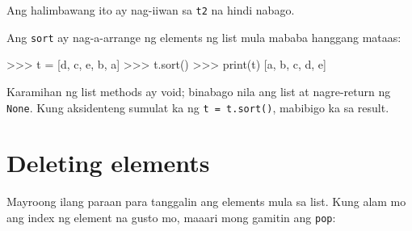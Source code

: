\documentclass[10pt,]{book}
\newenvironment{Shaded}{}{}
\newcommand{\BuiltInTok}[1]{\textcolor[rgb]{0.00,0.50,0.00}{#1}}
\newcommand{\NormalTok}[1]{#1}
\newcommand{\OperatorTok}[1]{\textcolor[rgb]{0.40,0.40,0.40}{#1}}
\newcommand{\StringTok}[1]{\textcolor[rgb]{0.25,0.44,0.63}{#1}}
\begin{document}
Ang halimbawang ito ay nag-iiwan sa \texttt{t2} na hindi nabago.

Ang \texttt{sort} ay nag-a-arrange ng elements ng list mula mababa
hanggang mataas:

 

\begin{Shaded}
\begin{Highlighting}[]
\OperatorTok{\textgreater{}\textgreater{}\textgreater{}}\NormalTok{ t }\OperatorTok{=}\NormalTok{ [}\StringTok{\textquotesingle{}d\textquotesingle{}}\NormalTok{, }\StringTok{\textquotesingle{}c\textquotesingle{}}\NormalTok{, }\StringTok{\textquotesingle{}e\textquotesingle{}}\NormalTok{, }\StringTok{\textquotesingle{}b\textquotesingle{}}\NormalTok{, }\StringTok{\textquotesingle{}a\textquotesingle{}}\NormalTok{]}
\OperatorTok{\textgreater{}\textgreater{}\textgreater{}}\NormalTok{ t.sort()}
\OperatorTok{\textgreater{}\textgreater{}\textgreater{}} \BuiltInTok{print}\NormalTok{(t)}
\NormalTok{[}\StringTok{\textquotesingle{}a\textquotesingle{}}\NormalTok{, }\StringTok{\textquotesingle{}b\textquotesingle{}}\NormalTok{, }\StringTok{\textquotesingle{}c\textquotesingle{}}\NormalTok{, }\StringTok{\textquotesingle{}d\textquotesingle{}}\NormalTok{, }\StringTok{\textquotesingle{}e\textquotesingle{}}\NormalTok{]}
\end{Highlighting}
\end{Shaded}

Karamihan ng list methods ay void; binabago nila ang list at
nagre-return ng \texttt{None}. Kung aksidenteng sumulat ka ng
\texttt{t\ =\ t.sort()}, mabibigo ka sa result.

  

\section{Deleting elements}\label{deleting-elements}

 

Mayroong ilang paraan para tanggalin ang elements mula sa list. Kung
alam mo ang index ng element na gusto mo, maaari mong gamitin ang
\texttt{pop}:

 
\end{document}
